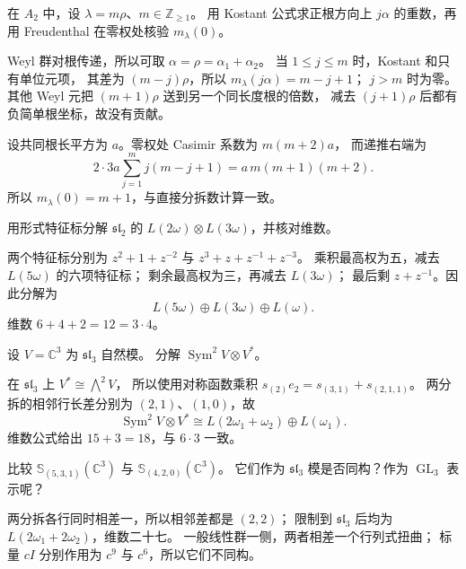 \begin{exercise}\label{b5:ex:19-kostant-root-line}
	在 \(A_2\) 中，设 \(\lambda=m\rho\)、\(m\in\mathbb Z_{\ge1}\)。 用 Kostant 公式求正根方向上 \(j\alpha\) 的重数，再用 Freudenthal 在零权处核验 \(m_\lambda(0)\)。
\end{exercise}
\begin{solution}
	Weyl 群对根传递，所以可取 \(\alpha=\rho=\alpha_1+\alpha_2\)。 当 \(1\le j\le m\) 时，Kostant 和只有单位元项， 其差为 \((m-j)\rho\)，所以 \(m_\lambda(j\alpha)=m-j+1\)； \(j>m\) 时为零。其他 Weyl 元把 \((m+1)\rho\) 送到另一个同长度根的倍数， 减去 \((j+1)\rho\) 后都有负简单根坐标，故没有贡献。

	设共同根长平方为 \(a\)。零权处 Casimir 系数为 \(m(m+2)a\)， 而递推右端为
	\[
		2\cdot3a\sum_{j=1}^m j(m-j+1) =a\,m(m+1)(m+2).
	\]
	所以 \(m_\lambda(0)=m+1\)，与直接分拆数计算一致。
\end{solution}

\begin{exercise}\label{b5:ex:19-sl2-tensor}
	用形式特征标分解 \(\mathfrak{sl}_2\) 的 \(L(2\omega)\otimes L(3\omega)\)，并核对维数。
\end{exercise}
\begin{solution}
	两个特征标分别为 \(z^2+1+z^{-2}\) 与 \(z^3+z+z^{-1}+z^{-3}\)。 乘积最高权为五，减去 \(L(5\omega)\) 的六项特征标； 剩余最高权为三，再减去 \(L(3\omega)\)； 最后剩 \(z+z^{-1}\)。因此分解为
	\[
		L(5\omega)\oplus L(3\omega)\oplus L(\omega).
	\]
	维数 \(6+4+2=12=3\cdot4\)。
\end{solution}

\begin{exercise}\label{b5:ex:19-symmetric-square-dual}
	设 \(V=\mathbb C^3\) 为 \(\mathfrak{sl}_3\) 自然模。 分解 \(\operatorname{Sym}^2V\otimes V^*\)。
\end{exercise}
\begin{solution}
	在 \(\mathfrak{sl}_3\) 上 \(V^*\cong\bigwedge^2V\)， 所以使用对称函数乘积 \(s_{(2)}e_2=s_{(3,1)}+s_{(2,1,1)}\)。 两分拆的相邻行长差分别为 \((2,1)\)、\((1,0)\)，故
	\[
		\operatorname{Sym}^2V\otimes V^* \cong L(2\omega_1+\omega_2)\oplus L(\omega_1).
	\]
	维数公式给出 \(15+3=18\)，与 \(6\cdot3\) 一致。
\end{solution}

\begin{exercise}\label{b5:ex:19-determinant-shift}
	比较 \(\mathbb S_{(5,3,1)}(\mathbb C^3)\) 与 \(\mathbb S_{(4,2,0)}(\mathbb C^3)\)。 它们作为 \(\mathfrak{sl}_3\) 模是否同构？作为 \(\operatorname{GL}_3\) 表示呢？
\end{exercise}
\begin{solution}
	两分拆各行同时相差一，所以相邻差都是 \((2,2)\)； 限制到 \(\mathfrak{sl}_3\) 后均为 \(L(2\omega_1+2\omega_2)\)，维数二十七。 一般线性群一侧，两者相差一个行列式扭曲； 标量 \(cI\) 分别作用为 \(c^9\) 与 \(c^6\)，所以它们不同构。
\end{solution}

